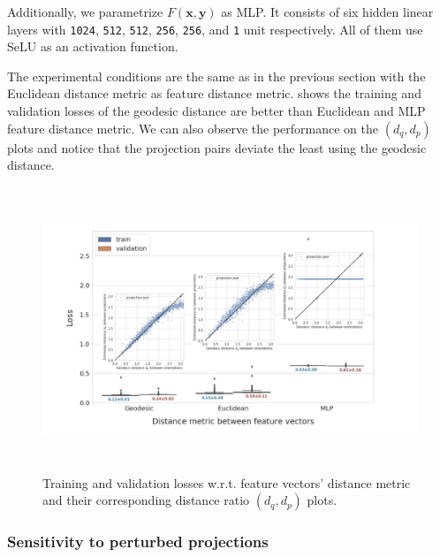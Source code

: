 Additionally, we parametrize $F(\mathbf{x},\mathbf{y})$ as MLP. It consists of six hidden linear layers with \texttt{1024}, \texttt{512}, \texttt{512}, \texttt{256}, \texttt{256}, and \texttt{1} unit respectively. All of them use SeLU as an activation function.

The experimental conditions are the same as in the previous section with the Euclidean distance metric as feature distance metric.
 shows the training and validation losses of the geodesic distance are better than Euclidean and MLP feature distance metric. We can also observe the performance on the $(d_q, d_p)$ plots and notice that the projection pairs deviate the least using the geodesic distance.

\begin{figure}
    \centering
    \includegraphics[height=8.5cm]{images/geo_eucl_mlp_distance_metric.pdf}
    \caption{Training and validation losses w.r.t. feature vectors' distance metric and their corresponding distance ratio $(d_q, d_p)$ plots.}
    \label{fig:geo-eucl-mlp}
\end{figure}


\subsubsection{Sensitivity to perturbed projections}\label{sec:results:distance-estimation:sensitivity}


